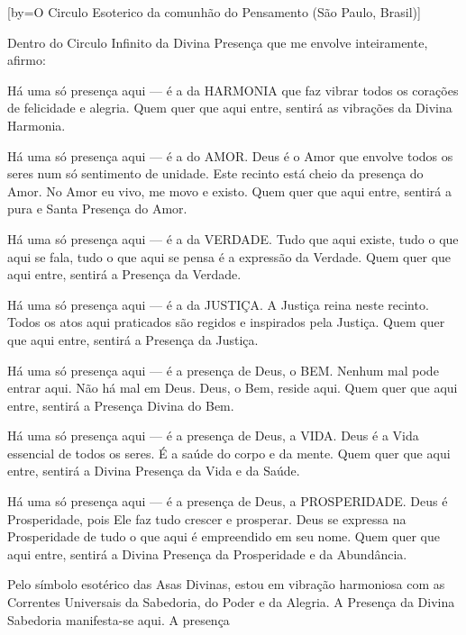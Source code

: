 \scleardpage
{}[by={O Circulo Esoterico da comunhão do Pensamento (São Paulo, Brasil)}]
  \begin{passage}[PT]{}
    \par
    Dentro do Circulo Infinito da Divina Presença que
    me envolve inteiramente, afirmo:
    \par
    Há uma só presença aqui --- é a da HARMONIA que faz
    vibrar todos os corações de felicidade e alegria.
    Quem quer que aqui entre, sentirá as vibrações da
    Divina Harmonia.
    \par
    Há uma só presença aqui --- é a do AMOR. Deus é o
    Amor que envolve todos os seres num só sentimento
    de unidade. Este recinto está cheio da presença do
    Amor. No Amor eu vivo, me movo e existo. Quem quer
    que aqui entre, sentirá a pura e Santa Presença do
    Amor.
    \par
    Há uma só presença aqui --- é a da VERDADE. Tudo
    que aqui existe, tudo o que aqui se fala, tudo o
    que aqui se pensa é a expressão da Verdade. Quem
    quer que aqui entre, sentirá a Presença da Verdade.
    \par
    Há uma só presença aqui --- é a da JUSTIÇA.
    A Justiça reina neste recinto. Todos os atos aqui
    praticados são regidos e inspirados pela Justiça.
    Quem quer que aqui entre, sentirá
    a Presença da Justiça.
    \par
    Há uma só presença aqui --- é a presença de Deus,
    o BEM. Nenhum mal pode entrar aqui. Não há mal em
    Deus. Deus, o Bem, reside aqui. Quem quer que aqui
    entre, sentirá a Presença Divina do Bem.
    \par
    Há uma só presença aqui --- é a presença de Deus,
    a VIDA. Deus é a Vida essencial de todos os seres.
    É a saúde do corpo e da mente. Quem quer que aqui
    entre, sentirá a Divina Presença da Vida e da Saúde.
    \par
    Há uma só presença aqui --- é a presença de Deus,
    a PROSPERIDADE. Deus é Prosperidade, pois Ele faz
    tudo crescer e prosperar. Deus se expressa na
    Prosperidade de tudo o que aqui é empreendido em
    seu nome. Quem quer que aqui entre, sentirá
    a Divina Presença da Prosperidade e da Abundância.
    \hardbrk\par
    Pelo símbolo esotérico das Asas Divinas, estou
    em vibração harmoniosa com as Correntes Universais
    da Sabedoria, do Poder e da Alegria. A Presença
    da Divina Sabedoria manifesta-se aqui. A presença

\end{passage}
